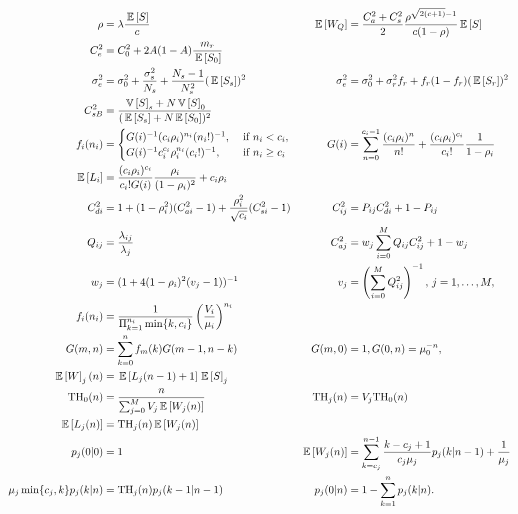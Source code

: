 \begin{align*}
\rho &= \lambda \frac{\,\mathbb{E}\left[S\right]}{c} &   \,\mathbb{E}\left[W_Q\right] &= \frac{C_a^2 + C_s^2}{2} \frac{\rho^{\sqrt{2(c+1)}-1}}{c(1-\rho)} \,\mathbb{E}\left[S\right]\\
C_e^2 &= C_0^2 + 2A(1-A)\frac{m_r}{\,\mathbb{E}\left[S_0\right]} \\
\sigma_e^2 &= \sigma_0^2 + \frac{\sigma_s^2}{N_s} + \frac{N_s -1}{N_s^2}(\,\mathbb{E}\left[S_s\right])^2 
& \sigma_e^2 &= \sigma_0^2 + \sigma_r^2 f_r + f_r(1-f_r)(\,\mathbb{E}\left[S_r\right])^2 \\
C_{sB}^2 &= \frac{\,\mathbb{V}\left[S\right]_s + N \,\mathbb{V}\left[S\right]_0}{(\,\mathbb{E}\left[S_s\right] + N \,\mathbb{E}\left[S_0\right])^2}\\
f_i(n_i) &= 
           \begin{cases}
             G(i)^{-1} (c_i\rho_i)^{n_i}(n_i!)^{-1}, &\text{ if } n_i < c_i, \\ 
             G(i)^{-1} c_i^{c_i}\rho_i^{n_i}(c_i!)^{-1}, &\text{ if } n_i \geq c_i \\ 
           \end{cases} 
& G(i) &= \sum_{n=0}^{c_i-1} \frac{(c_i\rho_i)^n}{n!} + \frac{(c_i\rho_i)^{c_i}}{c_i!}\frac{1}{1-\rho_i} \\
\,\mathbb{E}\left[L_i\right] &= \frac{(c_i\rho_i)^{c_i}}{c_i!G(i)}\frac{\rho_i}{(1-\rho_i)^2} + c_i \rho_i \\
C_{di}^2 &= 1 + (1-\rho_i^2)(C_{ai}^2 - 1) + \frac{\rho_i^2}{\sqrt{c_i}}(C_{si}^2-1) 
& C_{ij}^2 &= P_{ij}C_{di}^2 + 1 - P_{ij}\\
Q_{ij} &= \frac{\lambda_{ij}}{\lambda_j} & C_{aj}^2 &= w_j\sum_{i=0}^M Q_{ij}C_{ij}^2 + 1 - w_j \\
w_j &= (1+4(1-\rho_i)^2(v_j-1))^{-1} & 
v_j &= \left(\sum_{i=0}^M Q_{ij}^2\right)^{-1}, \, j=1,\ldots, M,\\
f_{i}(n_i) &= \frac{1}{\Pi_{k=1}^{n_i} \min\{k, c_i\}}\left(\frac{V_i}{\mu_i}\right)^{n_i}\\
G(m,n) &= \sum_{k=0}^n f_m(k) G(m-1, n-k) &  G(m,0) &= 1, G(0,n) = \mu_0^{-n}, \\
\,\mathbb{E}\left[W\right]_j(n) &= \,\mathbb{E}\left[L_j(n-1) + 1\right] \,\mathbb{E}\left[S\right]_j \\
\text{TH}_0(n) &= \frac{n}{\sum_{j=0}^M V_j \,\mathbb{E}\left[W_j(n)\right]}  &  \text{TH}_j(n) &= V_j \text{TH}_0(n) \\
\,\mathbb{E}\left[L_j(n)\right] &= \text{TH}_j(n) \,\mathbb{E}\left[W_j(n)\right] \\
 p_j(0|0) & = 1  & \,\mathbb{E}\left[W_j(n)\right] &= \sum_{k=c_j}^{n-1} \frac{k-c_j+1}{c_j \mu_j} p_j(k|n-1) + \frac{1}{\mu_j} \\
\mu_j \min\{c_j,k\}p_j(k|n) &= \text{TH}_j(n) p_j(k-1|n-1) & p_j(0|n) &= 1 - \sum_{k=1}^n p_j(k|n).
\end{align*}


